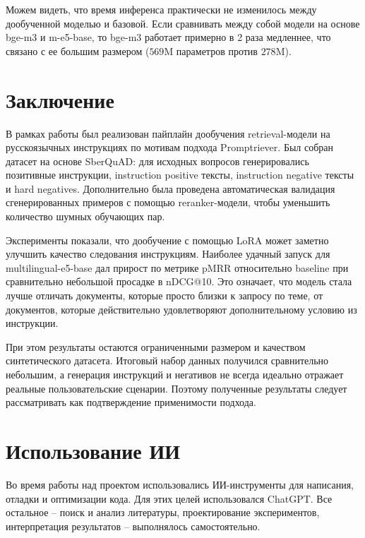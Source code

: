 \documentclass[12pt, a4paper, oneside]{article}
\begin{document}
Можем видеть, что время инференса практически не изменилось между 
дообученной моделью и базовой. 
Если сравнивать между собой модели на основе bge-m3 и m-e5-base, то 
bge-m3 работает примерно в 2 раза медленнее, 
что связано с ее большим размером ($569$M параметров против $278$M). 

\newpage

\section{Заключение}

В рамках работы был реализован пайплайн дообучения retrieval-модели на русскоязычных 
инструкциях по мотивам подхода Promptriever. Был собран датасет на основе SberQuAD: 
для исходных вопросов генерировались позитивные инструкции, instruction positive тексты, 
instruction negative тексты и hard negatives. Дополнительно была проведена автоматическая 
валидация сгенерированных примеров с помощью reranker-модели, чтобы уменьшить количество 
шумных обучающих пар.

Эксперименты показали, что дообучение с помощью LoRA может заметно улучшить качество 
следования инструкциям. Наиболее удачный запуск для multilingual-e5-base дал прирост 
по метрике pMRR относительно baseline при сравнительно небольшой просадке в nDCG@10. 
Это означает, что модель стала лучше отличать документы, которые просто близки к запросу 
по теме, от документов, которые действительно удовлетворяют дополнительному условию 
из инструкции.

При этом результаты остаются ограниченными размером и качеством синтетического датасета. 
Итоговый набор данных получился сравнительно небольшим, а генерация инструкций и негативов 
не всегда идеально отражает реальные пользовательские сценарии. Поэтому полученные результаты 
следует рассматривать как подтверждение применимости подхода.

\newpage

\section{Использование ИИ}

Во время работы над проектом использовались ИИ-инструменты 
для написания, отладки и оптимизации кода. Для этих целей использовался ChatGPT. 
Все остальное -- поиск и анализ литературы, проектирование экспериментов, интерпретация результатов -- 
выполнялось самостоятельно.

\newpage
\end{document}

